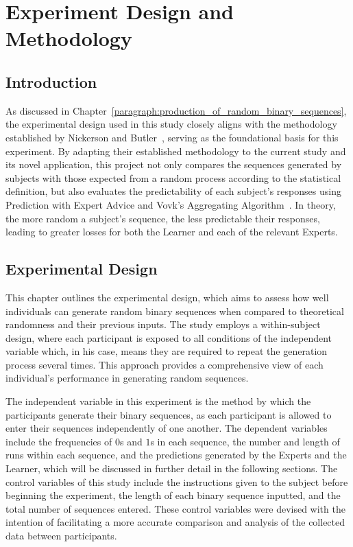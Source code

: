 \section{Experiment Design and Methodology}\label{section:experiment_design_and_methodology}
\subsection{Introduction}
As discussed in Chapter~\ref{paragraph:production_of_random_binary_sequences}, the experimental design used in this study closely aligns with the methodology established by Nickerson and Butler~\cite{nickerson:2009}, serving as the foundational basis for this experiment. By adapting their established methodology to the current study and its novel application, this project not only compares the sequences generated by subjects with those expected from a random process according to the statistical definition, but also evaluates the predictability of each subject's responses using Prediction with Expert Advice and Vovk's Aggregating Algorithm~\cite{vovk:1990}. In theory, the more random a subject's sequence, the less predictable their responses, leading to greater losses for both the Learner and each of the relevant Experts.

\subsection{Experimental Design}
This chapter outlines the experimental design, which aims to assess how well individuals can generate random binary sequences when compared to theoretical randomness and their previous inputs. The study employs a within-subject design, where each participant is exposed to all conditions of the independent variable which, in his case, means they are required to repeat the generation process several times. This approach provides a comprehensive view of each individual's performance in generating random sequences.

The independent variable in this experiment is the method by which the participants generate their binary sequences, as each participant is allowed to enter their sequences independently of one another. The dependent variables include the frequencies of $0$s and $1$s in each sequence, the number and length of runs within each sequence, and the predictions generated by the Experts and the Learner, which will be discussed in further detail in the following sections. The control variables of this study include the instructions given to the subject before beginning the experiment, the length of each binary sequence inputted, and the total number of sequences entered. These control variables were devised with the intention of facilitating a more accurate comparison and analysis of the collected data between participants.

